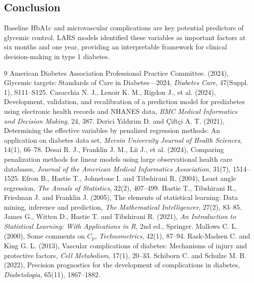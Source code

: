 \documentclass[twoside]{article}
\begin{document}
\subsection{Conclusion}
Baseline HbA1c and microvascular complications are key potential predictors of glycemic control. LARS models identified these variables as important factors at six months and one year, providing an interpretable framework for clinical decision-making in type 1 diabetes.
\begin{thebibliography}{9}
American Diabetes Association Professional Practice Committee. (2024), Glycemic targets: Standards of Care in Diabetes---2024, {\it Diabetes Care}, 47(Suppl. 1), S111--S125.
Casacchia N. J., Lenoir K. M., Rigdon J., et al. (2024), Development, validation, and recalibration of a prediction model for prediabetes using electronic health records and NHANES data, {\it BMC Medical Informatics and Decision Making}, 24, 387.
Derici Yıldırım D. and Çiftçi A. T. (2021), Determining the effective variables by penalized regression methods: An application on diabetes data set, {\it Mersin University Journal of Health Sciences}, 14(1), 66--78.
Desai R. J., Franklin J. M., Lii J., et al. (2024), Comparing penalization methods for linear models using large observational health care databases, {\it Journal of the American Medical Informatics Association}, 31(7), 1514--1525.
Efron B., Hastie T., Johnstone I. and Tibshirani R. (2004), Least angle regression, {\it The Annals of Statistics}, 32(2), 407--499.
Hastie T., Tibshirani R., Friedman J. and Franklin J. (2005), The elements of statistical learning: Data mining, inference and prediction, {\it The Mathematical Intelligencer}, 27(2), 83--85.
James G., Witten D., Hastie T. and Tibshirani R. (2021), {\it An Introduction to Statistical Learning: With Applications in R}, 2nd ed., Springer.
Mallows C. L. (2000), Some comments on $C_p$, {\it Technometrics}, 42(1), 87--94.
Rask-Madsen C. and King G. L. (2013), Vascular complications of diabetes: Mechanisms of injury and protective factors, {\it Cell Metabolism}, 17(1), 20--33.
Schiborn C. and Schulze M. B. (2022), Precision prognostics for the development of complications in diabetes, {\it Diabetologia}, 65(11), 1867--1882.
\end{thebibliography}
 
\end{document}
